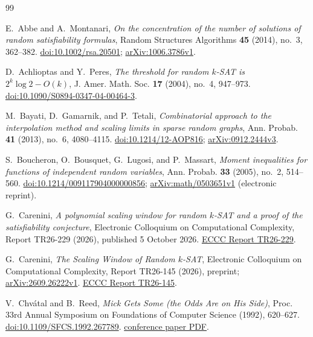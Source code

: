 \begingroup\small
\begin{thebibliography}{99}
\setlength{\itemsep}{0pt}

E.~Abbe and A.~Montanari,
\emph{On the concentration of the number of solutions of random
satisfiability formulas},
Random Structures Algorithms \textbf{45} (2014), no.~3, 362--382.
\href{https://doi.org/10.1002/rsa.20501}{doi:10.1002/rsa.20501};
\href{https://arxiv.org/abs/1006.3786v1}{arXiv:1006.3786v1}.

D.~Achlioptas and Y.~Peres,
\emph{The threshold for random \(k\)-SAT is \(2^k\log2-O(k)\)},
J. Amer. Math. Soc. \textbf{17} (2004), no.~4, 947--973.
\href{https://doi.org/10.1090/S0894-0347-04-00464-3}
{doi:10.1090/S0894-0347-04-00464-3}.

M.~Bayati, D.~Gamarnik, and P.~Tetali,
\emph{Combinatorial approach to the interpolation method and scaling
limits in sparse random graphs},
Ann. Probab. \textbf{41} (2013), no.~6, 4080--4115.
\href{https://doi.org/10.1214/12-AOP816}{doi:10.1214/12-AOP816};
\href{https://arxiv.org/abs/0912.2444v3}{arXiv:0912.2444v3}.

S.~Boucheron, O.~Bousquet, G.~Lugosi, and P.~Massart,
\emph{Moment inequalities for functions of independent random variables},
Ann. Probab. \textbf{33} (2005), no.~2, 514--560.
\href{https://doi.org/10.1214/009117904000000856}
{doi:10.1214/009117904000000856};
\href{https://arxiv.org/abs/math/0503651v1}{arXiv:math/0503651v1}
(electronic reprint).

G.~Carenini,
\emph{A polynomial scaling window for random \(k\)-SAT and a proof of
the satisfiability conjecture},
Electronic Colloquium on Computational Complexity,
Report TR26-229 (2026), published 5 October 2026.
\href{https://eccc.weizmann.ac.il/report/2026/229/}{ECCC Report TR26-229}.

G.~Carenini,
\emph{The Scaling Window of Random \(k\)-SAT},
Electronic Colloquium on Computational Complexity,
Report TR26-145 (2026), preprint;
\href{https://arxiv.org/abs/2609.26222v1}{arXiv:2609.26222v1}.
\href{https://eccc.weizmann.ac.il/report/2026/145/}{ECCC Report TR26-145}.

V.~Chv\'atal and B.~Reed,
\emph{Mick Gets Some (the Odds Are on His Side)},
Proc. 33rd Annual Symposium on Foundations of Computer Science (1992),
620--627.
\href{https://doi.org/10.1109/SFCS.1992.267789}{doi:10.1109/SFCS.1992.267789}.
\href{https://www.diochnos.com/teaching/CS5970/2020F/project-papers/ChvatalReed.pdf}{conference paper PDF}.


\end{thebibliography}
